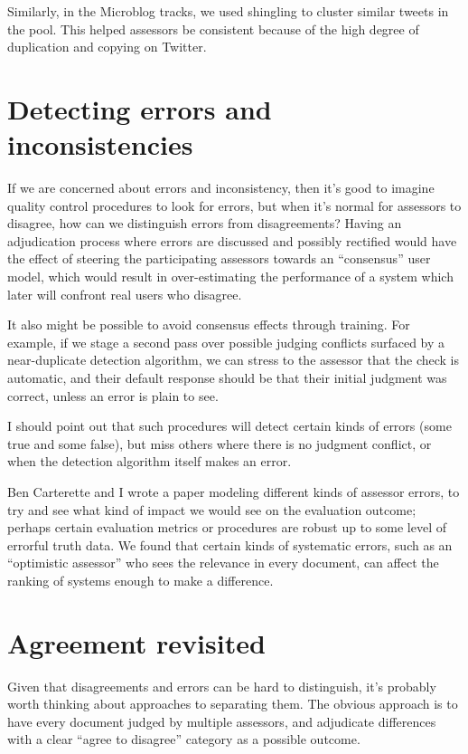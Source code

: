 \documentclass[nobib]{tufte-book}
\begin{document}
Similarly, in the Microblog tracks, we used shingling\autocite{broder_syntactic_1997} to cluster similar tweets in the pool.  This helped assessors be consistent because of the high degree of duplication and copying on Twitter.

\section{Detecting errors and inconsistencies}

If we are concerned about errors and inconsistency, then it's good to imagine quality control procedures to look for errors, but when it's normal for assessors to disagree, how can we distinguish errors from disagreements?  Having an adjudication process where errors are discussed and possibly rectified would have the effect of steering the participating assessors towards an ``consensus'' user model, which would result in over-estimating the performance of a system which later will confront real users who disagree.

It also might be possible to avoid consensus effects through training.  For example, if we stage a second pass over possible judging conflicts surfaced by a near-duplicate detection algorithm, we can stress to the assessor that the check is automatic, and their default response should be that their initial judgment was correct, unless an error is plain to see.

I should point out that such procedures will detect certain kinds of errors (some true and some false), but miss others where there is no judgment conflict, or when the detection algorithm itself makes an error.

Ben Carterette and I wrote a paper modeling different kinds of assessor errors, to try and see what kind of impact we would see on the evaluation outcome; perhaps certain evaluation metrics or procedures are robust up to some level of errorful truth data.\autocite{carterette_effect_2010} We found that certain kinds of systematic errors, such as an ``optimistic assessor'' who sees the relevance in every document, can affect the ranking of systems enough to make a difference.

\section{Agreement revisited}

Given that disagreements and errors can be hard to distinguish, it's probably worth thinking about approaches to separating them.  The obvious approach is to have every document judged by multiple assessors, and adjudicate differences with a clear ``agree to disagree'' category as a possible outcome.
\end{document}
